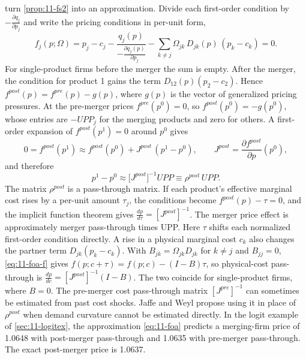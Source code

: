  \citet{JaffeWeyl2013} turn \cref{prop:11-fs2} into an approximation. Divide each
first-order condition by $-\frac{\partial q_j}{\partial p_j}$ and write the pricing conditions in per-unit form,
\begin{equation}\label{eq:11-foa-f}
  f_j(p;\Omega) = p_j - c_j - \frac{q_j(p)}{-\frac{\partial q_j(p)}{\partial p_j}}
  - \sum_{k \ne j} \Omega_{jk}\, D_{jk}(p)\,(p_k - c_k) = 0 .
\end{equation}
For single-product firms before the merger the sum is empty. After the merger, the condition for product 1 gains the
term $D_{12}(p)(p_2 - c_2)$. Hence $f^{post}(p) = f^{pre}(p) - g(p)$, where $g(p)$ is the vector of generalized pricing
pressures. At the pre-merger prices $f^{pre}(p^0) = 0$, so $f^{post}(p^0) = -g(p^0)$, whose entries are $-\mathit{UPP}_j$
for the merging products and zero for others. A first-order expansion of $f^{post}(p^1) = 0$ around $p^0$ gives
\begin{equation*}
  0 = f^{post}(p^1) \approx f^{post}(p^0) + J^{post}\,(p^1 - p^0) , \qquad J^{post} = \frac{\partial f^{post}}{\partial p}(p^0) ,
\end{equation*}
and therefore
\begin{equation}\label{eq:11-foa}
  p^1 - p^0 \approx \big[J^{post}\big]^{-1} \mathit{UPP} \equiv \rho^{post}\, \mathit{UPP} .
\end{equation}
The matrix $\rho^{post}$ is a pass-through matrix. If each product's effective marginal cost rises by a per-unit amount
$\tau_j$, the conditions become $f^{post}(p) - \tau = 0$, and the implicit function theorem gives
$\frac{dp}{d\tau} = [J^{post}]^{-1}$. The merger price effect is approximately merger pass-through times UPP. Here $\tau$
shifts each normalized first-order condition directly. A rise in a physical marginal cost $c_k$ also changes the partner
term $D_{jk}(p_k - c_k)$. With $B_{jk} = \Omega_{jk}D_{jk}$ for $k \ne j$ and $B_{jj} = 0$,
\eqref{eq:11-foa-f} gives $f(p; c + \tau) = f(p; c) - (I - B)\tau$, so physical-cost pass-through is
$\frac{dp}{dc} = [J^{post}]^{-1}(I - B)$. The two coincide for single-product firms, where $B = 0$. The
pre-merger cost pass-through matrix $[J^{pre}]^{-1}$ can sometimes be estimated from past cost shocks. Jaffe and Weyl
propose using it in place of $\rho^{post}$ when demand curvature cannot be estimated directly. In the logit example of
\cref{sec:11-logitex}, the approximation \eqref{eq:11-foa} predicts a merging-firm price of 1.0648 with post-merger
pass-through and 1.0635 with pre-merger pass-through. The exact post-merger price is 1.0637.

